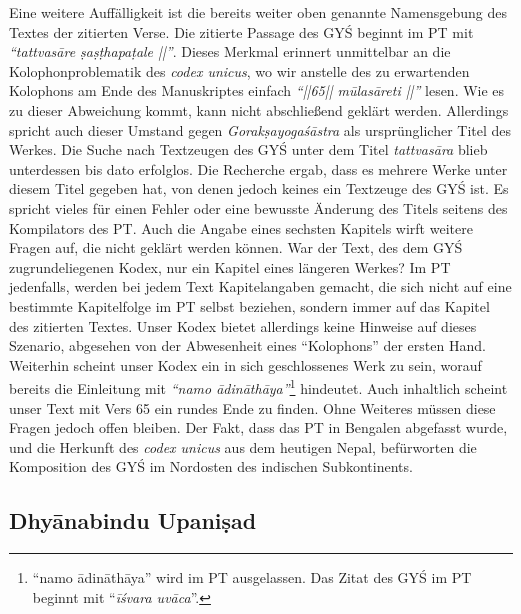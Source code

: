 \documentclass[a4paper,12pt]{article}
\begin{document}
Eine weitere Auffälligkeit ist die bereits weiter oben genannte Namensgebung des Textes der zitierten Verse. Die zitierte Passage des GYŚ beginnt im PT mit \textit{``tattvasāre ṣaṣṭhapaṭale ||''}. Dieses Merkmal erinnert unmittelbar an die Kolophonproblematik des \textit{codex unicus}, wo wir anstelle des zu erwartenden Kolophons am Ende des Manuskriptes einfach \textit{``||65|| mūlasāreti ||''} lesen. Wie es zu dieser Abweichung kommt, kann nicht abschließend geklärt werden. Allerdings spricht auch dieser Umstand gegen \textit{Gorakṣayogaśāstra} als ursprünglicher Titel des Werkes. Die Suche nach Textzeugen des GYŚ unter dem Titel \textit{tattvasāra} blieb unterdessen bis dato erfolglos. Die Recherche ergab, dass es mehrere Werke unter diesem Titel gegeben hat, von denen jedoch keines ein Textzeuge des GYŚ ist. Es spricht vieles für einen Fehler oder eine bewusste Änderung des Titels seitens des Kompilators des PT. Auch die Angabe eines sechsten Kapitels wirft weitere Fragen auf, die nicht geklärt werden können. War der Text, des dem GYŚ zugrundeliegenen Kodex, nur ein Kapitel eines längeren Werkes? Im PT jedenfalls, werden bei jedem Text Kapitelangaben gemacht, die sich nicht auf eine bestimmte Kapitelfolge im PT selbst beziehen, sondern immer auf das Kapitel des zitierten Textes. Unser Kodex bietet allerdings keine Hinweise auf dieses Szenario, abgesehen von der Abwesenheit eines ``Kolophons'' der ersten Hand. Weiterhin scheint unser Kodex ein in sich geschlossenes Werk zu sein, worauf bereits die Einleitung mit \textit{``namo ādināthāya''}\footnote{``namo ādināthāya'' wird im PT ausgelassen. Das Zitat des GYŚ im PT beginnt mit ``\textit{īśvara uvāca}''.} hindeutet. Auch inhaltlich scheint unser Text mit Vers 65 ein rundes Ende zu finden. Ohne Weiteres müssen diese Fragen jedoch offen bleiben. Der Fakt, dass das PT in Bengalen abgefasst wurde, und die Herkunft des \textit{codex unicus} aus dem heutigen Nepal, befürworten die Komposition des GYŚ im Nordosten des indischen Subkontinents. 

\subsection{Dhyānabindu Upaniṣad}
\label{dhbu}
\end{document}
